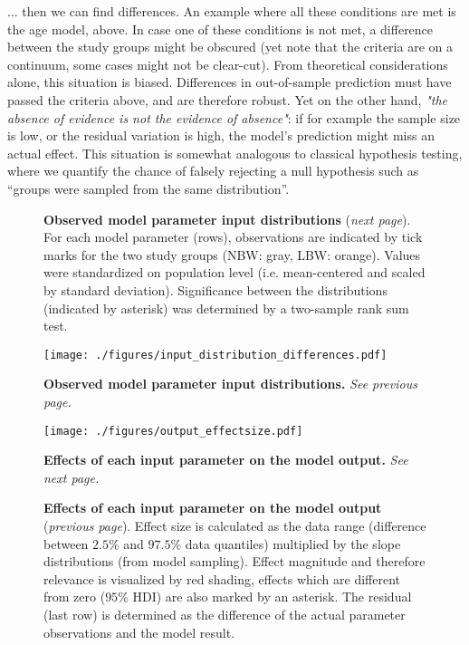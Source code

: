 \begin{change}
... then we can find differences.
An example where all these conditions are met is the age model, above.
In case one of these conditions is not met, a difference between the study groups might be obscured (yet note that the criteria are on a continuum, some cases might not be clear-cut).
From theoretical considerations alone, this situation is biased.
Differences in out-of-sample prediction must have passed the criteria above, and are therefore robust.
Yet on the other hand, \textit{"the absence of evidence is not the evidence of absence"}: if for example the sample size is low, or the residual variation is high, the model's prediction might miss an actual effect.
This situation is somewhat analogous to classical hypothesis testing, where we quantify the chance of falsely rejecting a null hypothesis such as ``groups were sampled from the same distribution''.

\begin{figure}[p]
  \caption{ \textbf{Observed model parameter input distributions} (\textit{next page}).
For each model parameter (rows), observations are indicated by tick marks for the two study groups (NBW: gray, LBW: orange). Values were standardized on population level (i.e. mean-centered and scaled by standard deviation). Significance between the distributions (indicated by asterisk) was determined by a two-sample rank sum test. }
\end{figure}

\addtocounter{figure}{-1}
\begin{figure}[p!]
\centering
\texttt{[image: ./figures/input\_distribution\_differences.pdf]}
\caption{\label{fig:input_distributions}\textbf{Observed model parameter input distributions.} \textit{See previous page.}}
\end{figure}



\begin{figure}[p!]
\centering
\texttt{[image: ./figures/output\_effectsize.pdf]}
\caption{\label{fig:output_effects}\textbf{Effects of each input parameter on the model output.} \textit{See next page.} }
\end{figure}
\addtocounter{figure}{-1}
\begin{figure}[p]
  \caption{ \textbf{Effects of each input parameter on the model output} (\textit{previous page}).
Effect size is calculated as the data range (difference between \(2.5\%\) and \(97.5\%\) data quantiles) multiplied by the slope distributions (from model sampling). Effect magnitude and therefore relevance is visualized by red shading, effects which are different from zero (\(95\%\) HDI) are also marked by an asterisk. The residual (last row) is determined as the difference of the actual parameter observations and the model result. }
\end{figure}




\end{change}
